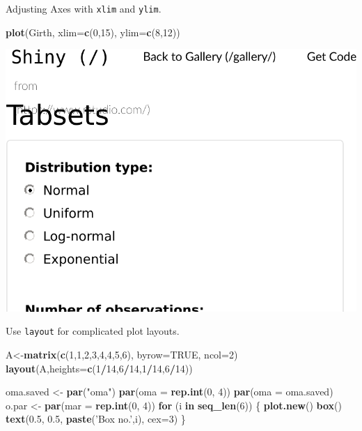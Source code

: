 \documentclass[]{book}
\newenvironment{Shaded}{\begin{snugshade}}{\end{snugshade}}
\newcommand{\ControlFlowTok}[1]{\textcolor[rgb]{0.13,0.29,0.53}{\textbf{#1}}}
\newcommand{\DataTypeTok}[1]{\textcolor[rgb]{0.13,0.29,0.53}{#1}}
\newcommand{\DecValTok}[1]{\textcolor[rgb]{0.00,0.00,0.81}{#1}}
\newcommand{\FloatTok}[1]{\textcolor[rgb]{0.00,0.00,0.81}{#1}}
\newcommand{\KeywordTok}[1]{\textcolor[rgb]{0.13,0.29,0.53}{\textbf{#1}}}
\newcommand{\NormalTok}[1]{#1}
\newcommand{\OperatorTok}[1]{\textcolor[rgb]{0.81,0.36,0.00}{\textbf{#1}}}
\newcommand{\OtherTok}[1]{\textcolor[rgb]{0.56,0.35,0.01}{#1}}
\newcommand{\StringTok}[1]{\textcolor[rgb]{0.31,0.60,0.02}{#1}}
\theoremstyle{definition}
\theoremstyle{definition}
\theoremstyle{definition}
\theoremstyle{remark}
\begin{document}
Adjusting Axes with \texttt{xlim} and \texttt{ylim}.

\begin{Shaded}
\begin{Highlighting}[]
\KeywordTok{plot}\NormalTok{(Girth, }\DataTypeTok{xlim=}\KeywordTok{c}\NormalTok{(}\DecValTok{0}\NormalTok{,}\DecValTok{15}\NormalTok{), }\DataTypeTok{ylim=}\KeywordTok{c}\NormalTok{(}\DecValTok{8}\NormalTok{,}\DecValTok{12}\NormalTok{))}
\end{Highlighting}
\end{Shaded}

\includegraphics[width=0.5\linewidth]{Rcourse_files/figure-latex/unnamed-chunk-259-1}

Use \texttt{layout} for complicated plot layouts.

\begin{Shaded}
\begin{Highlighting}[]
\NormalTok{A<-}\KeywordTok{matrix}\NormalTok{(}\KeywordTok{c}\NormalTok{(}\DecValTok{1}\NormalTok{,}\DecValTok{1}\NormalTok{,}\DecValTok{2}\NormalTok{,}\DecValTok{3}\NormalTok{,}\DecValTok{4}\NormalTok{,}\DecValTok{4}\NormalTok{,}\DecValTok{5}\NormalTok{,}\DecValTok{6}\NormalTok{), }\DataTypeTok{byrow=}\OtherTok{TRUE}\NormalTok{, }\DataTypeTok{ncol=}\DecValTok{2}\NormalTok{)}
\KeywordTok{layout}\NormalTok{(A,}\DataTypeTok{heights=}\KeywordTok{c}\NormalTok{(}\DecValTok{1}\OperatorTok{/}\DecValTok{14}\NormalTok{,}\DecValTok{6}\OperatorTok{/}\DecValTok{14}\NormalTok{,}\DecValTok{1}\OperatorTok{/}\DecValTok{14}\NormalTok{,}\DecValTok{6}\OperatorTok{/}\DecValTok{14}\NormalTok{))}

\NormalTok{oma.saved <-}\StringTok{ }\KeywordTok{par}\NormalTok{(}\StringTok{"oma"}\NormalTok{)}
\KeywordTok{par}\NormalTok{(}\DataTypeTok{oma =} \KeywordTok{rep.int}\NormalTok{(}\DecValTok{0}\NormalTok{, }\DecValTok{4}\NormalTok{))}
\KeywordTok{par}\NormalTok{(}\DataTypeTok{oma =}\NormalTok{ oma.saved)}
\NormalTok{o.par <-}\StringTok{ }\KeywordTok{par}\NormalTok{(}\DataTypeTok{mar =} \KeywordTok{rep.int}\NormalTok{(}\DecValTok{0}\NormalTok{, }\DecValTok{4}\NormalTok{))}
\ControlFlowTok{for}\NormalTok{ (i }\ControlFlowTok{in} \KeywordTok{seq_len}\NormalTok{(}\DecValTok{6}\NormalTok{)) \{}
    \KeywordTok{plot.new}\NormalTok{()}
    \KeywordTok{box}\NormalTok{()}
    \KeywordTok{text}\NormalTok{(}\FloatTok{0.5}\NormalTok{, }\FloatTok{0.5}\NormalTok{, }\KeywordTok{paste}\NormalTok{(}\StringTok{'Box no.'}\NormalTok{,i), }\DataTypeTok{cex=}\DecValTok{3}\NormalTok{)}
\NormalTok{\}}
\end{Highlighting}
\end{Shaded}
\end{document}
